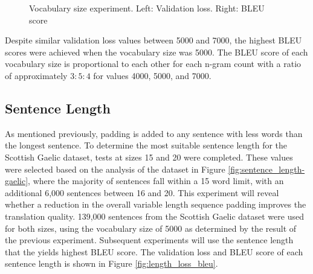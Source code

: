 \begin{figure}[ht!]
\centering
{}
\captionsetup{justification=centering}
\caption[Vocabulary size experiment validation loss and BLEU score]{Vocabulary size experiment. Left: Validation loss. Right: BLEU score}
\label{fig:vocab_loss_bleu}
\end{figure}

Despite similar validation loss values between 5000 and 7000, the highest \acrshort{BLEU} scores were achieved when the vocabulary size was 5000. The \acrshort{BLEU} score of each vocabulary size is proportional to each other for each n-gram count with a ratio of approximately $3:5:4$ for values 4000, 5000, and 7000. 


\subsection{Sentence Length}
\label{sec:4-sentence_length}

As mentioned previously, padding is added to any sentence with less words than the longest sentence. To determine the most suitable sentence length for the Scottish Gaelic dataset, tests at sizes 15 and 20 were completed. These values were selected based on the analysis of the dataset in Figure \ref{fig:sentence_length-gaelic}, where the majority of sentences fall within a 15 word limit, with an additional 6,000 sentences between 16 and 20. This experiment will reveal whether a reduction in the overall variable length sequence padding improves the translation quality.
139,000 sentences from the Scottish Gaelic dataset were used for both sizes, using the vocabulary size of 5000 as determined by the result of the previous experiment. Subsequent experiments will use the sentence length that the yields highest \acrshort{BLEU} score. The validation loss and \acrshort{BLEU} score of each sentence length is shown in Figure \ref{fig:length_loss_bleu}.

